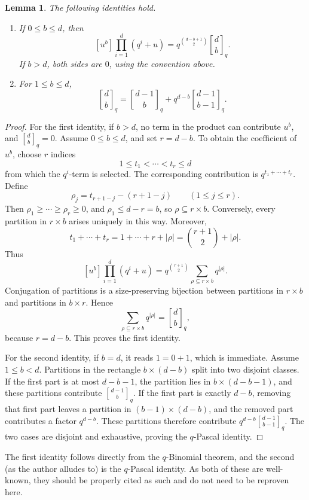 \documentclass[12pt]{article}
\newtheorem{lemma}[theorem]{Lemma}
\newcommand{\qbinom}[2]{\genfrac{[}{]}{0pt}{}{#1}{#2}_q}
\newcommand{\review}[1]{\begin{reviewbox}#1\end{reviewbox}}
\begin{document}
\begin{lemma}\label{lem:gaussian}
The following identities hold.

\begin{enumerate}
\item If \(0\le b\le d\), then
\[
[u^b]\prod_{i=1}^{d}(q^i+u)
=
q^{\binom{d-b+1}{2}}\qbinom{d}{b}.
\]
If \(b>d\), both sides are \(0\), using the convention above.

\item For \(1\le b\le d\),
\[
\qbinom{d}{b}
=
\qbinom{d-1}{b}
+
q^{d-b}\qbinom{d-1}{b-1}.
\]
\end{enumerate}
\end{lemma}

\begin{proof}
For the first identity, if \(b>d\), no term in the product can contribute \(u^b\), and \(\qbinom{d}{b}=0\).  Assume \(0\le b\le d\), and set \(r=d-b\).  To obtain the coefficient of \(u^b\), choose \(r\) indices
\[
1\le t_1<\cdots<t_r\le d
\]
from which the \(q^i\)-term is selected.  The corresponding contribution is \(q^{t_1+\cdots+t_r}\).  Define
\[
\rho_j=t_{r+1-j}-(r+1-j)\qquad (1\le j\le r).
\]
Then \(\rho_1\ge \cdots\ge \rho_r\ge 0\), and \(\rho_1\le d-r=b\), so \(\rho\subseteq r\times b\).  Conversely, every partition in \(r\times b\) arises uniquely in this way.  Moreover,
\[
t_1+\cdots+t_r
=
1+\cdots+r+|\rho|
=
\binom{r+1}{2}+|\rho|.
\]
Thus
\[
[u^b]\prod_{i=1}^{d}(q^i+u)
=
q^{\binom{r+1}{2}}
\sum_{\rho\subseteq r\times b}q^{|\rho|}.
\]
Conjugation of partitions is a size-preserving bijection between partitions in \(r\times b\) and partitions in \(b\times r\).  Hence
\[
\sum_{\rho\subseteq r\times b}q^{|\rho|}
=
\qbinom{d}{b},
\]
because \(r=d-b\).  This proves the first identity.

For the second identity, if \(b=d\), it reads \(1=0+1\), which is immediate.  Assume \(1\le b<d\).  Partitions in the rectangle \(b\times(d-b)\) split into two disjoint classes.  If the first part is at most \(d-b-1\), the partition lies in \(b\times(d-b-1)\), and these partitions contribute \(\qbinom{d-1}{b}\).  If the first part is exactly \(d-b\), removing that first part leaves a partition in \((b-1)\times(d-b)\), and the removed part contributes a factor \(q^{d-b}\).  These partitions therefore contribute \(q^{d-b}\qbinom{d-1}{b-1}\).  The two cases are disjoint and exhaustive, proving the \(q\)-Pascal identity.
\end{proof}

\review{The first identity follows directly from the $q$-Binomial theorem, and the second (as the author alludes to) is the $q$-Pascal identity. As both of these are well-known, they should be properly cited as such and do not need to be reproven here.}
\end{document}
